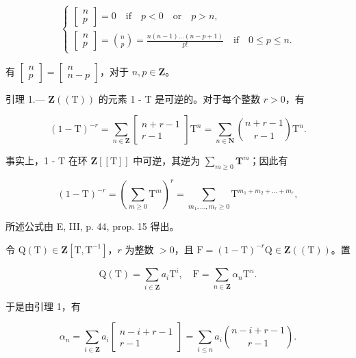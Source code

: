 \[
\left\{ \begin{array}{l} {\left[ \begin{array}{l} n \\ p \end{array} \right] = 0 \quad \text {if} \quad p <   0 \quad \text {or} \quad p > n,} \\ {\left[ \begin{array}{l} n \\ p \end{array} \right] = \binom {n} {p} = \frac {n (n - 1) \dots (n - p + 1)}{p !} \quad \text {if} \quad 0 \leqslant p \leqslant n.} \end{array} \right.\tag{1}
\]

有 \(\begin{bmatrix} n \\ p \end{bmatrix} = \begin{bmatrix} n \\ n - p \end{bmatrix}\)，对于 \(n, p \in \mathbf{Z}\)。

引理 1.--- \(\mathbf{Z}((\mathrm{T}))\) 的元素 1 - T 是可逆的。对于每个整数 \(r > 0\)，有

\[
(1 - \mathrm{T}) ^ {- r} = \sum_ {n \in \mathbf {Z}} \left[ \begin{array}{c} n + r - 1 \\ r - 1 \end{array} \right] \mathrm{T} ^ {n} = \sum_ {n \in \mathbf {N}} \binom {n + r - 1} {r - 1} \mathrm{T} ^ {n}.
\]

事实上，1 - T 在环 \(\mathbf{Z}[[\mathrm{T}]]\) 中可逆，其逆为 \(\sum_{m\geqslant 0}\mathbf{T}^m\)；因此有

\[
(1 - \mathrm{T}) ^ {- r} = (\sum_ {m \geqslant 0} \mathrm{T} ^ {m}) ^ {r} = \sum_ {m _ {1}, \dots , m _ {r} \geqslant 0} \mathrm{T} ^ {m _ {1} + m _ {2} + \dots + m _ {r}},
\]

所述公式由 E, III, p. 44, prop. 15 得出。

令 \(\mathrm{Q}(\mathrm{T}) \in \mathbf{Z}[\mathrm{T}, \mathrm{T}^{-1}]\)，\(r\) 为整数 \(> 0\)，且 \(\mathrm{F} = (1 - \mathrm{T})^{-r}\mathrm{Q} \in \mathbf{Z}((\mathrm{T}))\)。置

\[
\mathrm{Q} (\mathrm{T}) = \sum_ {i \in \mathbf {Z}} a _ {i} \mathrm{T} ^ {i}, \quad \mathrm{F} = \sum_ {n \in \mathbf {Z}} \alpha_ {n} \mathrm{T} ^ {n}.
\]

于是由引理 1，有

\[
\alpha_ {n} = \sum_ {i \in \mathbf {Z}} a _ {i} \left[ \begin{array}{c} n - i + r - 1 \\ r - 1 \end{array} \right] = \sum_ {i \leqslant n} a _ {i} \binom {n - i + r - 1} {r - 1}.
\]

